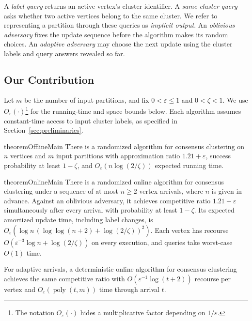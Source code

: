\documentclass[11pt]{article}
\begin{document}
A \emph{label query} returns an active vertex's cluster identifier. A
\emph{same-cluster query} asks whether two active vertices belong to the
same cluster. We refer to representing a partition through these queries
as \emph{implicit output}. An \emph{oblivious adversary} fixes the update
sequence before the algorithm makes its random choices. An
\emph{adaptive adversary} may choose the next update using the cluster
labels and query answers revealed so far.

\subsection{Our Contribution}

Let $m$ be the number of input partitions, and fix
$0<\varepsilon\le1$ and $0<\zeta<1$. We use
$O_\varepsilon(\cdot)$\footnote{The notation $O_\varepsilon(\cdot)$
hides a multiplicative factor depending on $1/\varepsilon$.}
for the running-time and space bounds below. Each algorithm assumes constant-time access
to input cluster labels,
as specified in Section~\ref{sec:preliminaries}.

\begin{restatable}{theorem}{OfflineMain}
\label{off:linear}
There is a randomized algorithm for consensus clustering on $n$ vertices
and $m$ input partitions with approximation ratio $1.21+\varepsilon$,
success probability at least $1-\zeta$, and
$O_\varepsilon(n\log(2/\zeta))$ expected running time.
\end{restatable}

\begin{restatable}{theorem}{OnlineMain}
\label{on:loglog}
There is a randomized online algorithm for consensus clustering under
a sequence of at most $n\ge2$ vertex arrivals, where $n$ is given in advance.
Against an oblivious adversary, it achieves competitive ratio
$1.21+\varepsilon$ simultaneously after every arrival with probability
at least $1-\zeta$. Its expected amortized update time, including label
changes, is
$O_\varepsilon(\log n\,(\log\log(n+2)+\log(2/\zeta))^2)$.
Each vertex has recourse $O(\varepsilon^{-3}\log n+\log(2/\zeta))$
on every execution, and queries take worst-case $O(1)$ time.

For adaptive arrivals, a deterministic online algorithm for consensus
clustering achieves the same competitive ratio with
$O(\varepsilon^{-1}\log(t+2))$ recourse per vertex and
$O_\varepsilon(\operatorname{poly}(t,m))$ time through arrival $t$.
\end{restatable}
\end{document}
